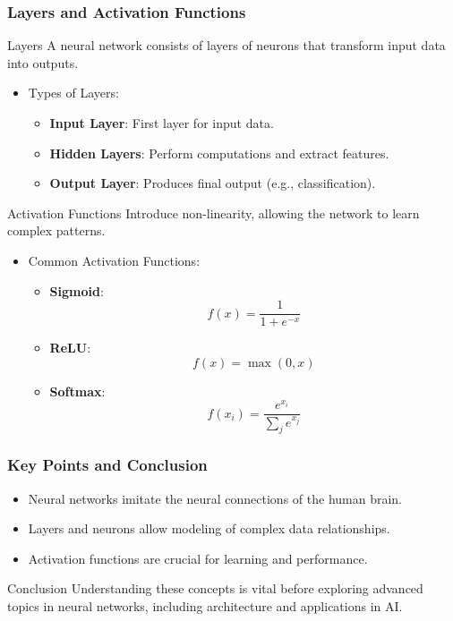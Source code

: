 \documentclass[aspectratio=169]{beamer}
\begin{document}
\begin{frame}[fragile]
    \frametitle{Layers and Activation Functions}
    \begin{block}{Layers}
        A neural network consists of layers of neurons that transform input data into outputs.
    \end{block}
    \begin{itemize}
        \item Types of Layers:
        \begin{itemize}
            \item \textbf{Input Layer}: First layer for input data.
            \item \textbf{Hidden Layers}: Perform computations and extract features.
            \item \textbf{Output Layer}: Produces final output (e.g., classification).
        \end{itemize}
    \end{itemize}

    \begin{block}{Activation Functions}
        Introduce non-linearity, allowing the network to learn complex patterns.
    \end{block}
    \begin{itemize}
        \item Common Activation Functions:
        \begin{itemize}
            \item \textbf{Sigmoid}:
            \[
            f(x) = \frac{1}{1 + e^{-x}}
            \]
            \item \textbf{ReLU}:
            \[
            f(x) = \max(0, x)
            \]
            \item \textbf{Softmax}:
            \[
            f(x_i) = \frac{e^{x_i}}{\sum_{j} e^{x_j}}
            \]
        \end{itemize}
    \end{itemize}
\end{frame}

\begin{frame}[fragile]
    \frametitle{Key Points and Conclusion}
    \begin{itemize}
        \item Neural networks imitate the neural connections of the human brain.
        \item Layers and neurons allow modeling of complex data relationships.
        \item Activation functions are crucial for learning and performance.
    \end{itemize}
    \begin{block}{Conclusion}
        Understanding these concepts is vital before exploring advanced topics in neural networks, including architecture and applications in AI.
    \end{block}
\end{frame}
\end{document}

